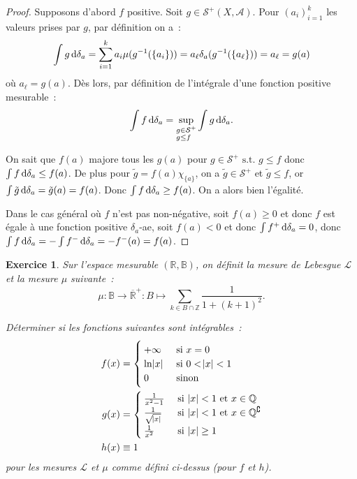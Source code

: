 \documentclass{article}
\newtheorem{ex}{Exercice}[section]
\theoremstyle{definition}
\newcommand{\pinfty}{{+\infty}}
\newcommand{\st}{\text{ s.t. }}
\newcommand{\C}{\complement}
\newcommand{\Z}{{\mathbb Z}}
\newcommand{\Q}{{\mathbb Q}}
\newcommand{\R}{{\mathbb R}}
\newcommand{\B}{{\mathbb B}}
\begin{document}
\begin{proof} Supposons d'abord $f$ positive. Soit $g \in \mathcal S^+(X, \mathcal A)$. Pour $(a_i)_{i=1}^k$ les valeurs prises par $g$, par définition on a~:
\[\int g\dif\delta_a = \sum_{i=1}^ka_i\mu(g^{-1}(\{a_i\})) = a_\ell\delta_a(g^{-1}(\{a_\ell\})) = a_\ell = g(a)\]
où $a_\ell = g(a)$. Dès lors, par définition de l'intégrale d'une fonction positive mesurable~:
\[\int f\dif\delta_a = \sup_{\begin{subarray}{l} g \in \mathcal S^+ \\ g \leq f \end{subarray}}\int g\dif\delta_a.\]

On sait que $f(a)$ majore tous les $g(a)$ pour $g \in \mathcal S^+ \st g \leq f$ donc $\int f\dif\delta_a \leq f(a)$. De plus pour $\tilde g = f(a)\chi_{\{a\}}$, on a
$\tilde g \in \mathcal S^+$ et $\tilde g \leq f$, or $\int \tilde g\dif\delta_a = \tilde g(a) = f(a)$. Donc $\int f\dif\delta_a \geq f(a)$. On a alors bien l'égalité.

Dans le cas général où $f$ n'est pas non-négative, soit $f(a) \geq 0$ et donc $f$ est égale à une fonction positive $\delta_a$-ae, soit $f(a) < 0$ et donc $\int f^+\dif\delta_a = 0$,
donc $\int f\dif\delta_a = -\int f^-\dif\delta_a = -f^-(a) = f(a)$.
\end{proof}

\begin{ex} Sur l'espace mesurable $(\R, \B)$, on définit la mesure de Lebesgue $\mathcal L$ et la mesure $\mu$ suivante~:
\[\mu : \B \to \overline \R^+ : B \mapsto \sum_{k \in B \cap \Z}\frac 1{1 + (k+1)^2}.\]

Déterminer si les fonctions suivantes sont intégrables~:
\begin{align*}
	f(x) &=
	\begin{cases}
		\pinfty &\text{ si } x=0 \\
		\ln\abs x & \text{ si } 0 < \abs x < 1 \\
		0 &\text{ sinon}
	\end{cases} \\
	g(x) &=
	\begin{cases}
		\frac 1{x^2-1} &\text{ si } \abs x < 1 \text{ et } x \in \Q \\
		\frac 1{\sqrt {\abs x}} &\text{ si } \abs x < 1 \text{ et } x \in \Q^\C\\
		\frac 1{x^2} & \text{ si }\abs x \geq 1
	\end{cases} \\
	h(x) &\equiv 1
\end{align*}
pour les mesures $\mathcal L$ et $\mu$ comme défini ci-dessus (pour $f$ et $h$).
\end{ex}
\end{document}
